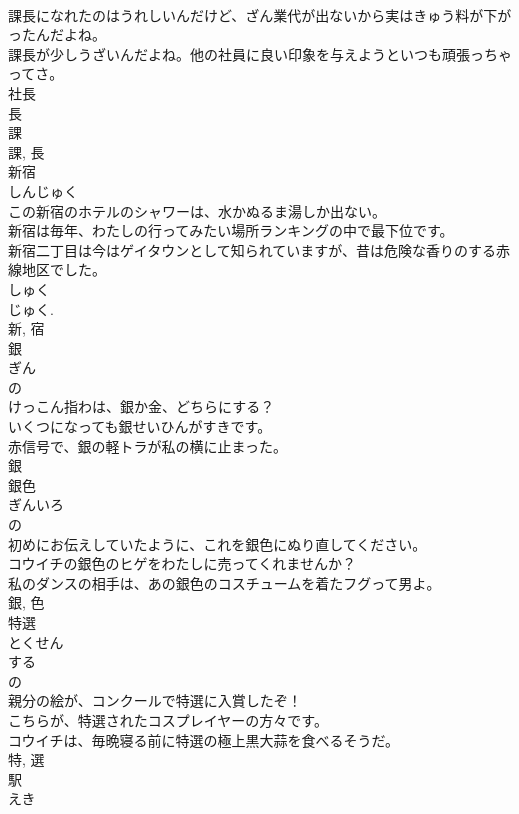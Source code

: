 \documentclass[8pt]{extreport}
\begin{document}
\begin{CJK}{UTF8}{min}
\\	課長になれたのはうれしいんだけど、ざん業代が出ないから実はきゅう料が下がったんだよね。	
\\	課長が少しうざいんだよね。他の社員に良い印象を与えようといつも頑張っちゃってさ。	
\\	社長 
\\	長 
\\	課 
\\	課, 長	
\\	新宿	
\\	しんじゅく	
\\	この新宿のホテルのシャワーは、水かぬるま湯しか出ない。	
\\	新宿は毎年、わたしの行ってみたい場所ランキングの中で最下位です。	
\\	新宿二丁目は今はゲイタウンとして知られていますが、昔は危険な香りのする赤線地区でした。	
\\	しゅく 
\\	じゅく. 
\\	新, 宿	
\\	銀	
\\	ぎん	
\\	の 
\\	けっこん指わは、銀か金、どちらにする？	
\\	いくつになっても銀せいひんがすきです。	
\\	赤信号で、銀の軽トラが私の横に止まった。	
\\	銀	
\\	銀色	
\\	ぎんいろ	
\\	の 
\\	初めにお伝えしていたように、これを銀色にぬり直してください。	
\\	コウイチの銀色のヒゲをわたしに売ってくれませんか？	
\\	私のダンスの相手は、あの銀色のコスチュームを着たフグって男よ。	
\\	銀, 色	
\\	特選	
\\	とくせん	
\\	する 
\\	の 
\\	親分の絵が、コンクールで特選に入賞したぞ！	
\\	こちらが、特選されたコスプレイヤーの方々です。	
\\	コウイチは、毎晩寝る前に特選の極上黒大蒜を食べるそうだ。	
\\	特, 選	
\\	駅	
\\	えき	

\end{CJK}
\end{document}
